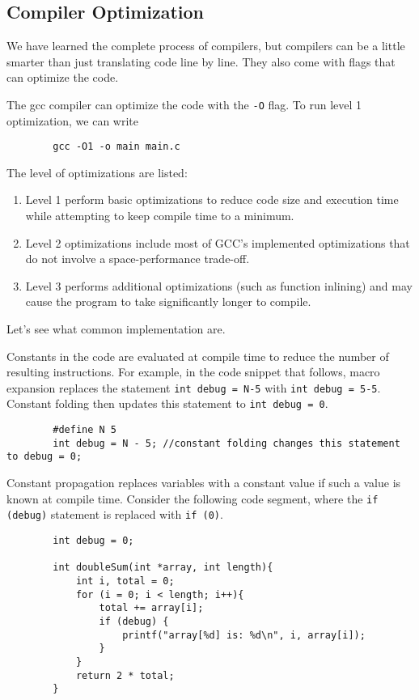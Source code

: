   \subsection{Compiler Optimization}

    We have learned the complete process of compilers, but compilers can be a little smarter than just translating code line by line. They also come with flags that can optimize the code. 

    \begin{definition}
      The gcc compiler can optimize the code with the \texttt{-O} flag. To run level 1 optimization, we can write 
      \begin{lstlisting}
        gcc -O1 -o main main.c
      \end{lstlisting}
      The level of optimizations are listed: 
      \begin{enumerate}
        \item Level 1 perform basic optimizations to reduce code size and execution time while attempting to keep compile time to a minimum. 
        \item Level 2 optimizations include most of GCC’s implemented optimizations that do not involve a space-performance trade-off. 
        \item Level 3 performs additional optimizations (such as function inlining) and may cause the program to take significantly longer to compile.
      \end{enumerate}
    \end{definition}

    Let's see what common implementation are. 

    \begin{definition}
      Constants in the code are evaluated at compile time to reduce the number of resulting instructions. For example, in the code snippet that follows, macro expansion replaces the statement \texttt{int debug = N-5} with \texttt{int debug = 5-5}. Constant folding then updates this statement to \texttt{int debug = 0}.
      \begin{lstlisting}
        #define N 5
        int debug = N - 5; //constant folding changes this statement to debug = 0; 
      \end{lstlisting}
    \end{definition}
    
    \begin{definition}
      Constant propagation replaces variables with a constant value if such a value is known at compile time. Consider the following code segment, where the \texttt{if (debug)} statement is replaced with \texttt{if (0)}.
      \begin{lstlisting}
        int debug = 0;

        int doubleSum(int *array, int length){
            int i, total = 0;
            for (i = 0; i < length; i++){
                total += array[i];
                if (debug) {
                    printf("array[%d] is: %d\n", i, array[i]);
                }
            }
            return 2 * total;
        }
      \end{lstlisting}
    \end{definition}

